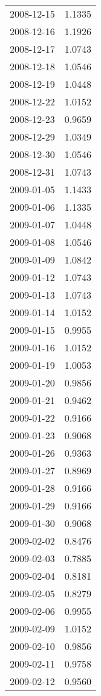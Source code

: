 \begin{tabular}{lr}
2008-12-15 &      1.1335 \\
2008-12-16 &      1.1926 \\
2008-12-17 &      1.0743 \\
2008-12-18 &      1.0546 \\
2008-12-19 &      1.0448 \\
2008-12-22 &      1.0152 \\
2008-12-23 &      0.9659 \\
2008-12-29 &      1.0349 \\
2008-12-30 &      1.0546 \\
2008-12-31 &      1.0743 \\
2009-01-05 &      1.1433 \\
2009-01-06 &      1.1335 \\
2009-01-07 &      1.0448 \\
2009-01-08 &      1.0546 \\
2009-01-09 &      1.0842 \\
2009-01-12 &      1.0743 \\
2009-01-13 &      1.0743 \\
2009-01-14 &      1.0152 \\
2009-01-15 &      0.9955 \\
2009-01-16 &      1.0152 \\
2009-01-19 &      1.0053 \\
2009-01-20 &      0.9856 \\
2009-01-21 &      0.9462 \\
2009-01-22 &      0.9166 \\
2009-01-23 &      0.9068 \\
2009-01-26 &      0.9363 \\
2009-01-27 &      0.8969 \\
2009-01-28 &      0.9166 \\
2009-01-29 &      0.9166 \\
2009-01-30 &      0.9068 \\
2009-02-02 &      0.8476 \\
2009-02-03 &      0.7885 \\
2009-02-04 &      0.8181 \\
2009-02-05 &      0.8279 \\
2009-02-06 &      0.9955 \\
2009-02-09 &      1.0152 \\
2009-02-10 &      0.9856 \\
2009-02-11 &      0.9758 \\
2009-02-12 &      0.9560 \\

\end{tabular}
